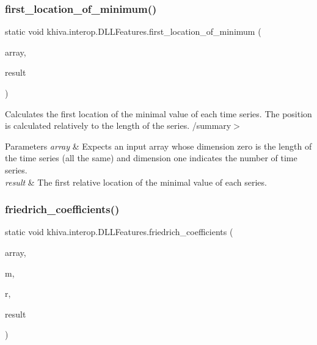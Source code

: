\subsubsection{\texorpdfstring{first\+\_\+location\+\_\+of\+\_\+minimum()}{first\_location\_of\_minimum()}}
{\footnotesize\ttfamily static void khiva.\+interop.\+D\+L\+L\+Features.\+first\+\_\+location\+\_\+of\+\_\+minimum (\begin{DoxyParamCaption}\item[{\mbox{[}\+In\mbox{]} ref Int\+Ptr}]{array,  }\item[{\mbox{[}\+Out\mbox{]} out Int\+Ptr}]{result }\end{DoxyParamCaption})\hspace{0.3cm}{\ttfamily [static]}}



Calculates the first location of the minimal value of each time series. The position is calculated relatively to the length of the series. /summary$>$ 
\begin{DoxyParams}{Parameters}
{\em array} & Expects an input array whose dimension zero is the length of the time series (all the same) and dimension one indicates the number of time series.\\
\hline
{\em result} & The first relative location of the minimal value of each series.\\
\hline
\end{DoxyParams}


\mbox{\label{classkhiva_1_1interop_1_1_d_l_l_features_afd32548eecfa4ff70d1f98dbfe7ca53b}} 
\subsubsection{\texorpdfstring{friedrich\+\_\+coefficients()}{friedrich\_coefficients()}}
{\footnotesize\ttfamily static void khiva.\+interop.\+D\+L\+L\+Features.\+friedrich\+\_\+coefficients (\begin{DoxyParamCaption}\item[{\mbox{[}\+In\mbox{]} ref Int\+Ptr}]{array,  }\item[{\mbox{[}\+In\mbox{]} ref int}]{m,  }\item[{\mbox{[}\+In\mbox{]} ref float}]{r,  }\item[{\mbox{[}\+Out\mbox{]} out Int\+Ptr}]{result }\end{DoxyParamCaption})\hspace{0.3cm}{\ttfamily [static]}}



